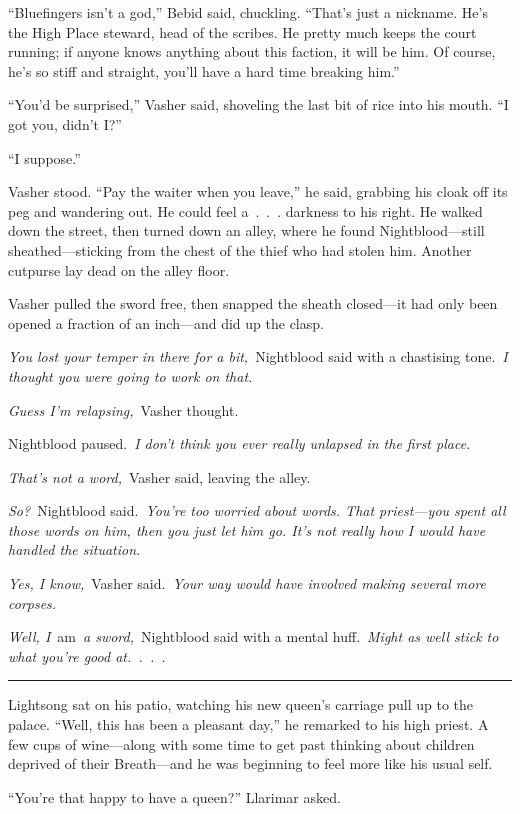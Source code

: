 “Bluefingers isn’t a god,” Bebid said, chuckling. “That’s just a nickname. He’s the High Place steward, head of the scribes. He pretty much keeps the court running; if anyone knows anything about this faction, it will be him. Of course, he’s so stiff and straight, you’ll have a hard time breaking him.”

“You’d be surprised,” Vasher said, shoveling the last bit of rice into his mouth. “I got you, didn’t I?”

“I suppose.”

Vasher stood. “Pay the waiter when you leave,” he said, grabbing his cloak off its peg and wandering out. He could feel a~.~.~. darkness to his right. He walked down the street, then turned down an alley, where he found Nightblood—still sheathed—sticking from the chest of the thief who had stolen him. Another cutpurse lay dead on the alley floor.

Vasher pulled the sword free, then snapped the sheath closed—it had only been opened a fraction of an inch—and did up the clasp.

\textit{You lost your temper in there for a bit,}~Nightblood said with a chastising tone.~\textit{I thought you were going to work on that.}

\textit{Guess I’m relapsing,}~Vasher thought.

Nightblood paused.~\textit{I don’t think you ever really unlapsed in the first place.}

\textit{That’s not a word,}~Vasher said, leaving the alley.

\textit{So?}~Nightblood said.~\textit{You’re too worried about words. That priest—you spent all those words on him, then you just let him go. It’s not really how I would have handled the situation.}

\textit{Yes, I know,}~Vasher said.~\textit{Your way would have involved making several more corpses.}

\textit{Well, I}~am~\textit{a sword,}~Nightblood said with a mental huff.~\textit{Might as well stick to what you’re good at.~.~.~.}

\bigskip \hrule \bigskip

Lightsong sat on his patio, watching his new queen’s carriage pull up to the palace. “Well, this has been a pleasant day,” he remarked to his high priest. A few cups of wine—along with some time to get past thinking about children deprived of their Breath—and he was beginning to feel more like his usual self.

“You’re that happy to have a queen?” Llarimar asked.


